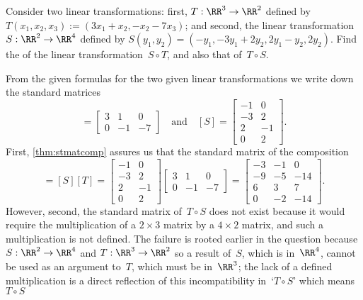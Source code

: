 \begin{example} 
Consider two linear transformations: first, \(T:\RR^3\to\RR^2\) defined by \(T(x_1,x_2,x_3):=(3x_1+x_2,-x_2-7x_3)\); and second, the linear transformation \(S:\RR^2\to\RR^4\) defined by \(S(y_1,y_2)=(-y_1, -3y_1+2y_2, 2y_1-y_2, 2y_2)\).
Find the  of the linear transformation~\(S\circ T\), and also that of~\(T\circ S\).
\begin{solution} 
From the given formulas for the two given linear transformations we write down the standard matrices
\begin{equation*}
[T]=\begin{bmatrix}3&1&0\\0&-1&-7  \end{bmatrix}
\quad\text{and}\quad
[S]=\begin{bmatrix} -1&0\\ -3&2\\2&-1\\0&2 \end{bmatrix}.
\end{equation*}
First, \cref{thm:stmatcomp} assures us that the standard matrix of the composition
\begin{equation*}
[S\circ T]
=[S][T]
=\begin{bmatrix} -1&0\\ -3&2\\2&-1\\0&2 \end{bmatrix}
\begin{bmatrix}3&1&0\\0&-1&-7  \end{bmatrix}
=\begin{bmatrix}-3&-1&0
\\-9&-5&-14
\\6&3&7
\\0&-2&-14 \end{bmatrix}.
\end{equation*}
However, second, the standard matrix of~\(T\circ S\) does not exist because it would require the multiplication of a \(2\times3\) matrix by a \(4\times 2\) matrix, and such a multiplication is not defined.
The failure is rooted earlier in the question because \(S:\RR^2\to\RR^4\) and \(T:\RR^3\to\RR^2\) so a result of~\(S\), which is in~\(\RR^4\), cannot be used as an argument to~\(T\), which must be in~\(\RR^3\); the lack of a defined multiplication is a direct reflection of this incompatibility in~`\(T\circ S\)' which means \(T\circ S\) 
\end{solution}
\end{example}


